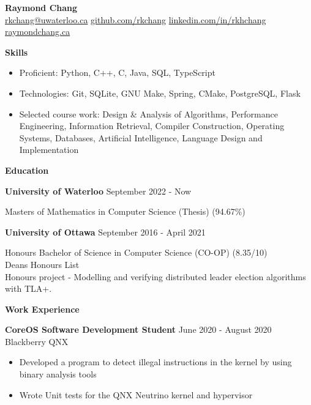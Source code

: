 \documentclass[10pt]{article}
\begin{document}
\begin{center}
    {\huge\textbf{Raymond Chang}} \\
     \href{mailto:rkchang@uwaterloo.ca}{rkchang@uwaterloo.ca}  \space\space
     \href{https://github.com/rkchang}{github.com/rkchang} \space\space
     \href{https://linkedin.com/in/rkhchang}{linkedin.com/in/rkhchang} \\
     \href{https://raymondchang.ca/}{raymondchang.ca} \\ \end{center}

{\Large\textbf{Skills}}\space \hrulefill
\begin{itemize}[noitemsep]
    \item Proficient: Python, C++, C, Java, SQL, TypeScript
    \item Technologies: Git, SQLite, GNU Make, Spring, CMake, PostgreSQL, Flask
    \item Selected course work:  Design \& Analysis of Algorithms, Performance Engineering, Information Retrieval, Compiler Construction, Operating Systems, Databases, Artificial Intelligence, Language Design and Implementation
\end{itemize}

\smallskip

{\Large\textbf{Education}}\space \hrulefill

\textbf{University of Waterloo} \hfill September 2022 - Now

Masters of Mathematics in Computer Science (Thesis) (94.67\%)

\hfill

\textbf{University of Ottawa} \hfill September 2016 - April 2021

Honours Bachelor of Science in Computer Science (CO-OP) (8.35/10) \\ Deans Honours List \\ Honours project - Modelling and verifying distributed leader election algorithms with TLA+.
\bigskip

{\Large\textbf{Work Experience}}\space \hrulefill

\textbf{CoreOS Software Development Student} \hfill June 2020 - August 2020 \\
Blackberry QNX
\begin{itemize}[noitemsep]
    \item Developed a program to detect illegal instructions in the kernel by using binary analysis tools
    \item Wrote Unit tests for the QNX Neutrino kernel and hypervisor
\end{itemize}
\end{document}
